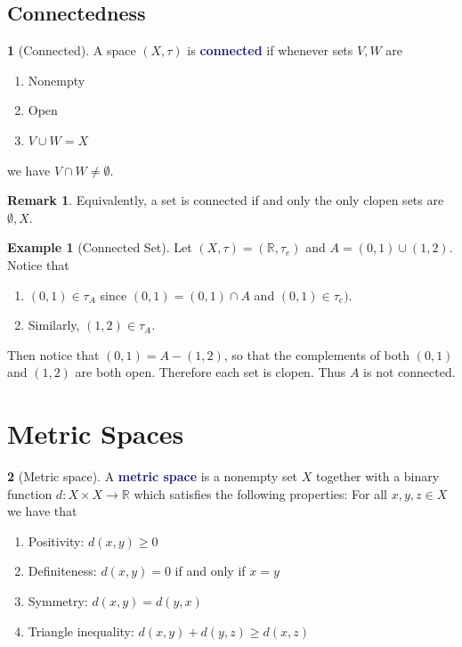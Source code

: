 \documentclass[11pt]{article}
\numberwithin{equation}{section}
\newcommand{\navy}[1]{\textcolor{MidnightBlue}{\bf #1}}
\theoremstyle{plain}
\theoremstyle{definition}
\newtheorem{definition}{\color{MidnightBlue}{\textbf{Definition}}}[section]
\newtheorem{example}{\color{WildStrawberry}Example}[section]
\newtheorem*{remark}{Remark}
\newcommand{\1}{\mathbbm 1}
\def\t{\tau}
\newcommand{\RR}{\mathbb R}
\begin{document}
\subsection{Connectedness}

\begin{definition}[Connected]
	A space $(X,\t)$ is \navy{connected} if whenever sets $V,W$ are
	\begin{enumerate}
		\item Nonempty
		\item Open
		\item $V \cup W = X$
	\end{enumerate}
	we have $V \cap W \neq \emptyset$. 
\end{definition}

\begin{remark}
	Equivalently, a set is connected if and only the only clopen sets are $\emptyset, X$. 
\end{remark}

\begin{example}[Connected Set]
	Let $(X,\t) = (\RR,\t_e)$ and $A = (0,1) \cup (1,2)$. Notice that
	\begin{enumerate}
		\item $(0,1) \in \t_A$ since $(0,1) = (0,1) \cap A$ and $(0,1) \in \t_e)$. 
		\item Similarly, $(1,2) \in \t_A$. 
	\end{enumerate}
	Then notice that $(0,1) = A - (1,2)$, so that the complements of both $(0,1)$ and $(1,2)$ are both open. Therefore each set is clopen. Thus $A$ is not connected. 
\end{example}



\section{Metric Spaces}

\begin{definition}[Metric space]
	A \navy{metric space} is a nonempty set $X$ together with a binary function $d : X\times X \to \RR$ which satisfies the following properties: For all $x,y,z \in X$ we have that
	\begin{enumerate}
		\item Positivity: $d(x,y) \geq 0$
		\item Definiteness: $d(x,y) = 0$ if and only if $x=y$
		\item Symmetry: $d(x,y) = d(y,x)$
		\item Triangle inequality: $d(x,y) + d(y,z) \geq d(x,z)$
	\end{enumerate}
\end{definition}
\end{document}
